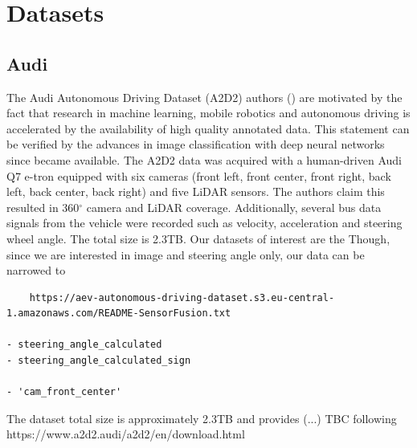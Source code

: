\chapter{Datasets} %

\label{AppendixD} %

\section{Audi}

The  Audi Autonomous Driving Dataset (A2D2)
authors (\cite{geyer2020a2d2}) are motivated by the fact that research in machine learning, mobile robotics and autonomous driving is accelerated by the availability of high quality annotated data. This statement can be verified by the advances in image classification with deep neural networks since \cite{IMAGENET} became available.  
The A2D2 data was acquired with a human-driven Audi Q7 e-tron equipped with six cameras (front left, front center, front right, back left, back center, back right) and five LiDAR sensors. The authors claim this resulted in  360$^{\circ}$ camera and LiDAR coverage. Additionally, several bus data signals from the vehicle were recorded such as velocity, acceleration and steering wheel angle. 
The total size is 2.3TB. Our datasets of interest are the  Though, since we are interested in image and steering angle only, our data can be narrowed to 
\begin{verbatim}
    https://aev-autonomous-driving-dataset.s3.eu-central-1.amazonaws.com/README-SensorFusion.txt
    
- steering_angle_calculated
- steering_angle_calculated_sign

- 'cam_front_center'
\end{verbatim}

The dataset total size is approximately 2.3TB and provides (...) TBC following https://www.a2d2.audi/a2d2/en/download.html

